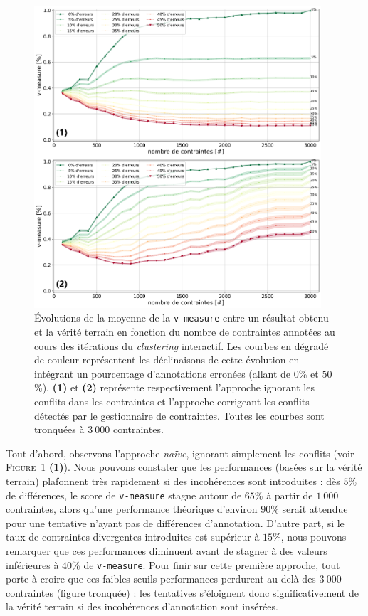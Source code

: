 			\begin{figure}[!htb]
				\centering
				\includegraphics[width=0.95\textwidth]{figures/etude-erreur-simulation-impact-closest}
				\caption{
					Évolutions de la moyenne de la \texttt{v-measure} entre un résultat obtenu et la vérité terrain en fonction du nombre de contraintes annotées au cours des itérations du \textit{clustering} interactif.
					Les courbes en dégradé de couleur représentent les déclinaisons de cette évolution en intégrant un pourcentage d'annotations erronées (allant de $0$\% et $50$\%).
					\textbf{(1)} et \textbf{(2)} représente respectivement l'approche ignorant les conflits dans les contraintes et l'approche corrigeant les conflits détectés par le gestionnaire de contraintes.
					Toutes les courbes sont tronquées à $3~000$ contraintes.
				}
				\label{figure:4.6.1-ETUDE-ROBUSTESSE-INTERETS-CORRECTION-INCOHERENCES}
			\end{figure}
			
			Tout d'abord, observons l'approche \textit{naïve}, ignorant simplement les conflits (voir \textsc{Figure~\ref{figure:4.6.1-ETUDE-ROBUSTESSE-INTERETS-CORRECTION-INCOHERENCES}} \textbf{(1)}).
			Nous pouvons constater que les performances (basées sur la vérité terrain) plafonnent très rapidement si des incohérences sont introduites : dès $5$\% de différences, le score de \texttt{v-measure} stagne autour de $65$\% à partir de $1~000$ contraintes, alors qu'une performance théorique d'environ $90$\% serait attendue pour une tentative n'ayant pas de différences d'annotation.
			D'autre part, si le taux de contraintes divergentes introduites est supérieur à $15$\%, nous pouvons remarquer que ces performances diminuent avant de stagner à des valeurs inférieures à $40$\% de \texttt{v-measure}.
			Pour finir sur cette première approche, tout porte à croire que ces faibles seuils performances perdurent au delà des $3~000$ contraintes (figure tronquée) : les tentatives s'éloignent donc significativement de la vérité terrain si des incohérences d'annotation sont insérées.
			
